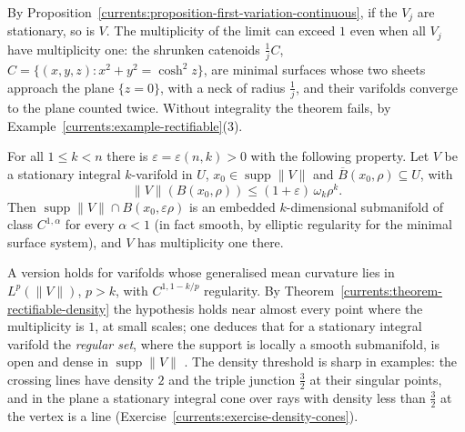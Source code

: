 By Proposition~\ref{currents:proposition-first-variation-continuous}, if the $V_j$ are stationary, so is $V$. The multiplicity of the limit can exceed $1$ even when all $V_j$ have multiplicity one: the shrunken
catenoids $\frac1jC$, $C = \{(x, y, z) : x^2 + y^2 = \cosh^2z\}$, are minimal surfaces whose two sheets approach the plane $\{z = 0\}$, with a neck of radius $\frac1j$, and their varifolds converge to the
plane counted twice. Without integrality the theorem fails, by Example~\ref{currents:example-rectifiable}(3).

\begin{theorem}\label{currents:theorem-allard-regularity}
For all $1 \leq k < n$ there is $\varepsilon = \varepsilon(n, k) > 0$ with the following property. Let $V$ be a stationary integral $k$-varifold in $U$, $x_0 \in \operatorname{supp}\|V\|$ and
$\overline{B}(x_0, \rho) \subseteq U$, with
\[
\|V\|(B(x_0, \rho)) \leq (1 + \varepsilon)\,\omega_k\rho^k .
\]
Then $\operatorname{supp}\|V\| \cap B(x_0, \varepsilon\rho)$ is an embedded $k$-dimensional submanifold of class $C^{1,\alpha}$ for every $\alpha < 1$ (in fact smooth, by elliptic regularity for the minimal surface
system), and $V$ has multiplicity one there.
\end{theorem}

A version holds for varifolds whose generalised mean curvature lies in $L^p(\|V\|)$, $p > k$, with $C^{1, 1 - k/p}$ regularity. By Theorem~\ref{currents:theorem-rectifiable-density} the hypothesis holds near
almost every point where the multiplicity is $1$, at small scales; one deduces that for a stationary integral varifold the \emph{regular set}, where the support is locally a smooth submanifold, is open and
dense in $\operatorname{supp}\|V\|$ \cite{allard-1972}. The density threshold is sharp in examples: the crossing lines have density $2$ and the triple junction $\frac32$ at their singular points, and in the
plane a stationary integral cone over rays with density less than $\frac32$ at the vertex is a line (Exercise~\ref{currents:exercise-density-cones}).

